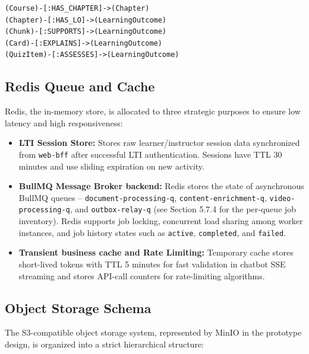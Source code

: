 \begin{verbatim}
(Course)-[:HAS_CHAPTER]->(Chapter)
(Chapter)-[:HAS_LO]->(LearningOutcome)
(Chunk)-[:SUPPORTS]->(LearningOutcome)
(Card)-[:EXPLAINS]->(LearningOutcome)
(QuizItem)-[:ASSESSES]->(LearningOutcome)
\end{verbatim}

\subsection{Redis Queue and Cache}

Redis, the in-memory store, is allocated to three strategic purposes to
ensure low latency and high responsiveness:

\begin{itemize}
    \item \textbf{LTI Session Store:} Stores raw learner/instructor
          session data synchronized from \texttt{web-bff} after successful
          LTI authentication. Sessions have TTL 30 minutes and use sliding
          expiration on new activity.
    \item \textbf{BullMQ Message Broker backend:} Redis stores the state
          of asynchronous BullMQ queues -- \texttt{document-processing-q},
          \texttt{content-enrichment-q}, \texttt{video-processing-q}, and
          \texttt{outbox-relay-q} (see Section 5.7.4 for the per-queue
          job inventory). Redis supports job locking, concurrent load
          sharing among worker instances, and job history states such as
          \texttt{active}, \texttt{completed}, and \texttt{failed}.
    \item \textbf{Transient business cache and Rate Limiting:} Temporary
          cache stores short-lived tokens with TTL 5 minutes for fast
          validation in chatbot SSE streaming and stores API-call counters
          for rate-limiting algorithms.
\end{itemize}

\subsection{Object Storage Schema}

The S3-compatible object storage system, represented by MinIO in the
prototype design, is organized into a strict hierarchical structure:


